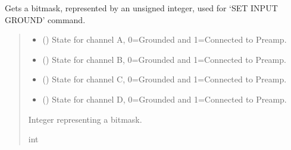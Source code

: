 \documentclass[letterpaper,10pt,english]{sphinxmanual}
\begin{document}
\begin{fulllineitems}
\begin{fulllineitems}
\label{\detokenize{PodApi.Devices:PodApi.Devices.PodDevice_8401HR.Pod8401HR.GetChannelBitmask}}
\pysigstartsignatures
{}
\pysigstopsignatures
\sphinxAtStartPar
Gets a bitmask, represented by an unsigned integer, used for ‘SET INPUT GROUND’ command.
\begin{quote}\begin{description}
\begin{itemize}
\item {} 
\sphinxAtStartPar
{} () \textendash{} State for channel A, 0=Grounded and 1=Connected to Preamp.

\item {} 
\sphinxAtStartPar
{} () \textendash{} State for channel B, 0=Grounded and 1=Connected to Preamp.

\item {} 
\sphinxAtStartPar
{} () \textendash{} State for channel C, 0=Grounded and 1=Connected to Preamp.

\item {} 
\sphinxAtStartPar
{} () \textendash{} State for channel D, 0=Grounded and 1=Connected to Preamp.

\end{itemize}

\sphinxAtStartPar
Integer representing a bitmask.

\sphinxAtStartPar
int

\end{description}\end{quote}

\end{fulllineitems}


\end{fulllineitems}
\end{document}
